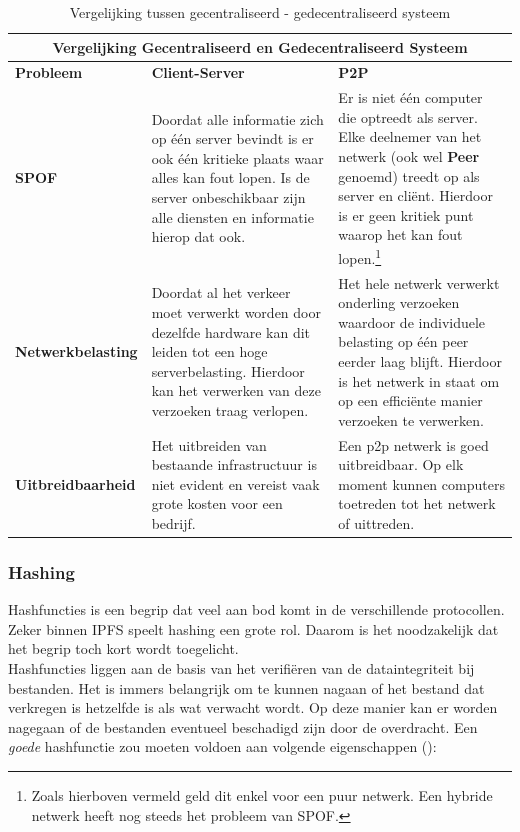 \begin{table}[h!]
	\centering
	\begin{tabular}{ |p{3cm}|p{6cm}|p{6cm}|}
		\hline
		\multicolumn{3}{|c|}{Vergelijking Gecentraliseerd en Gedecentraliseerd Systeem}\\
		\hline
		\textbf{Probleem}&\textbf{Client-Server}&\textbf{P2P}\\
		\hline
		\textbf{SPOF}&Doordat alle informatie zich op één server bevindt is er ook één kritieke plaats waar alles kan fout lopen. Is de server onbeschikbaar zijn alle diensten en informatie hierop dat ook.& Er is niet één computer die optreedt als server. Elke deelnemer van het netwerk (ook wel \textbf{Peer} genoemd) treedt op als server en cliënt. Hierdoor is er geen kritiek punt waarop het kan fout lopen.\footnote{Zoals hierboven vermeld geld dit enkel voor een puur netwerk. Een hybride netwerk heeft nog steeds het probleem van SPOF.}\\
		\hline
		\textbf{Netwerkbelasting}&Doordat al het verkeer moet verwerkt worden door dezelfde hardware kan dit leiden tot een hoge serverbelasting. Hierdoor kan het verwerken van deze verzoeken traag verlopen.&Het hele netwerk verwerkt onderling verzoeken waardoor de individuele belasting op één peer eerder laag blijft. Hierdoor is het netwerk in staat om op een efficiënte manier verzoeken te verwerken.\\
		\hline
		\textbf{Uitbreidbaarheid}&Het uitbreiden van bestaande infrastructuur is niet evident en vereist vaak grote kosten voor een bedrijf.&Een p2p netwerk is goed uitbreidbaar. Op elk moment kunnen computers toetreden tot het netwerk of uittreden.\\
		\hline
	\end{tabular}
	\label{tbl_concepts}
	\caption{Vergelijking tussen gecentraliseerd - gedecentraliseerd systeem}
\end{table}
\newpage
\subsubsection{Hashing}
\label{hashing}
Hashfuncties is een begrip dat veel aan bod komt in de verschillende protocollen.  Zeker binnen IPFS speelt hashing een grote rol. Daarom is het noodzakelijk dat het begrip toch kort wordt toegelicht.\\

Hashfuncties liggen aan de basis van het verifiëren van de dataintegriteit bij bestanden. Het is immers belangrijk om te kunnen nagaan of het bestand dat verkregen is hetzelfde is als wat verwacht wordt. Op deze manier kan er worden nagegaan of de bestanden eventueel beschadigd zijn door de overdracht. Een \textit{goede} hashfunctie zou moeten voldoen aan volgende eigenschappen (\autocite{Anderson93}):

